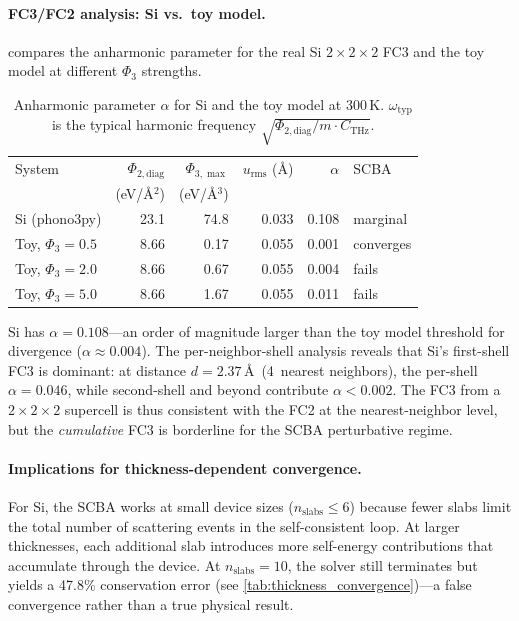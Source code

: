 \paragraph{FC3/FC2 analysis: Si vs.\ toy model.}
 compares the anharmonic parameter for the real Si
$2\times 2\times 2$ FC3 and the toy model at different $\Phi_3$
strengths.

\begin{table}[h]
  \centering
  \caption{Anharmonic parameter $\alpha$ for Si and the toy model at
    300\,K.  $\omega_\mathrm{typ}$ is the typical harmonic frequency
    $\sqrt{\Phi_{2,\mathrm{diag}} / m \cdot C_\mathrm{THz}}$.}
  \label{tab:alpha}
  \begin{tabular}{lrrrrl}
    \toprule
    System & $\Phi_{2,\mathrm{diag}}$ & $\Phi_{3,\max}$
      & $u_\mathrm{rms}$ (\AA) & $\alpha$ & SCBA \\
    & (eV/\AA$^2$) & (eV/\AA$^3$) & & & \\
    \midrule
    Si (phono3py) & 23.1 & 74.8 & 0.033 & 0.108 & marginal \\
    Toy, $\Phi_3 = 0.5$ & 8.66 & 0.17 & 0.055 & 0.001 & converges \\
    Toy, $\Phi_3 = 2.0$ & 8.66 & 0.67 & 0.055 & 0.004 & fails \\
    Toy, $\Phi_3 = 5.0$ & 8.66 & 1.67 & 0.055 & 0.011 & fails \\
    \bottomrule
  \end{tabular}
\end{table}

Si has $\alpha = 0.108$---an order of magnitude larger than the
toy model threshold for divergence ($\alpha \approx 0.004$).  The
per-neighbor-shell analysis reveals that Si's first-shell FC3 is
dominant: at distance $d = 2.37$\,\AA\ (4~nearest neighbors), the
per-shell $\alpha = 0.046$, while second-shell and beyond contribute
$\alpha < 0.002$.  The FC3 from a $2\times 2\times 2$ supercell is
thus consistent with the FC2 at the nearest-neighbor level, but the
\emph{cumulative} FC3 is borderline for the SCBA perturbative regime.

\paragraph{Implications for thickness-dependent convergence.}
For Si, the SCBA works at small device sizes ($n_\mathrm{slabs}
\leq 6$) because fewer slabs limit the total number of scattering
events in the self-consistent loop.  At larger thicknesses, each
additional slab introduces more self-energy contributions that
accumulate through the device.  At $n_\mathrm{slabs} = 10$, the
solver still terminates but yields a 47.8\% conservation error (see
\cref{tab:thickness_convergence})---a false convergence rather than a
true physical result.

